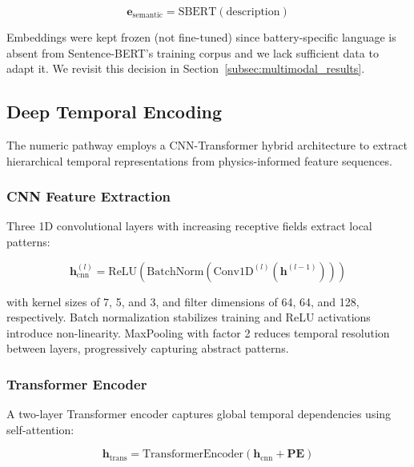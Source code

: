 \documentclass{sn-jnl}
\begin{document}
\begin{equation}
\label{eq:sbert}
    \mathbf{e}_{\text{semantic}} = \text{SBERT}(\text{description})
\end{equation}

Embeddings were kept frozen (not fine-tuned) since battery-specific language is absent from Sentence-BERT's training corpus and we lack sufficient data to adapt it. We revisit this decision in Section~\ref{subsec:multimodal_results}.

\subsection{Deep Temporal Encoding}
\label{subsec:temporal}

The numeric pathway employs a CNN-Transformer hybrid architecture to extract hierarchical temporal representations from physics-informed feature sequences.

\subsubsection{CNN Feature Extraction}
\label{subsubsec:cnn}

Three 1D convolutional layers with increasing receptive fields extract local patterns:

\begin{equation}
\label{eq:cnn}
    \mathbf{h}_{\text{cnn}}^{(l)} = \text{ReLU}(\text{BatchNorm}(\text{Conv1D}^{(l)}(\mathbf{h}^{(l-1)})))
\end{equation}

with kernel sizes of 7, 5, and 3, and filter dimensions of 64, 64, and 128, respectively. Batch normalization stabilizes training and ReLU activations introduce non-linearity. MaxPooling with factor 2 reduces temporal resolution between layers, progressively capturing abstract patterns.

\subsubsection{Transformer Encoder}
\label{subsubsec:transformer}

A two-layer Transformer encoder captures global temporal dependencies using self-attention:

\begin{equation}
\label{eq:transformer}
    \mathbf{h}_{\text{trans}} = \text{TransformerEncoder}(\mathbf{h}_{\text{cnn}} + \mathbf{PE})
\end{equation}
\end{document}
